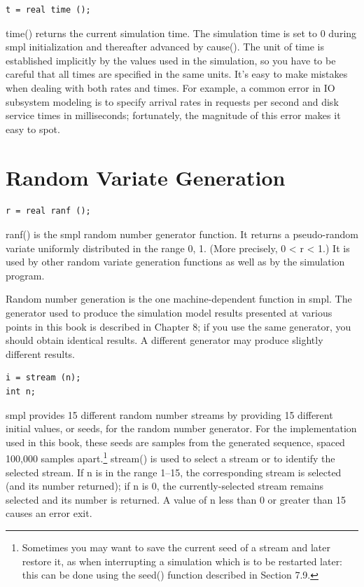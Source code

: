 \begin{verbatim}
t = real time ();
\end{verbatim}

time() returns the current simulation time. The simulation time is set to 0
during smpl initialization and thereafter advanced by cause(). The unit of
time is established implicitly by the values used in the simulation, so you
have to be careful that all times are specified in the same units. It's easy to
make mistakes when dealing with both rates and times. For example, a common
error in IO subsystem modeling is to specify arrival rates in requests per
second and disk service times in milliseconds; fortunately, the magnitude of
this error makes it easy to spot.

\section{Random Variate Generation}
\label{sec:smpl-random-variate-generation}

\begin{verbatim}
r = real ranf ();
\end{verbatim}

ranf() is the smpl random number generator function. It returns a
pseudo-random variate uniformly distributed in the range 0, 1. (More
precisely, 0 < r < 1.) It is used by other random variate generation functions
as well as by the simulation program.

Random number generation is the one machine-dependent function in smpl. The
generator used to produce the simulation model results presented at various
points in this book is described in Chapter 8; if you use the same generator,
you should obtain identical results. A different generator may produce
slightly different results.

\begin{verbatim}
i = stream (n);
int n;
\end{verbatim}

smpl provides 15 different random number streams by providing 15 different
initial values, or seeds, for the random number generator. For the
implementation used in this book, these seeds are samples from the generated
sequence, spaced 100,000 samples apart.\footnote{Sometimes you may want to
save the current seed of a stream and later restore it, as when interrupting a
simulation which is to be restarted later: this can be done using the seed()
function described in Section 7.9.} stream() is used to select a stream or to
identify the selected stream. If n is in the range 1--15, the corresponding
stream is selected (and its number returned); if n is 0, the currently-selected
stream remains selected and its number is returned. A value of n less than 0
or greater than 15 causes an error exit.

